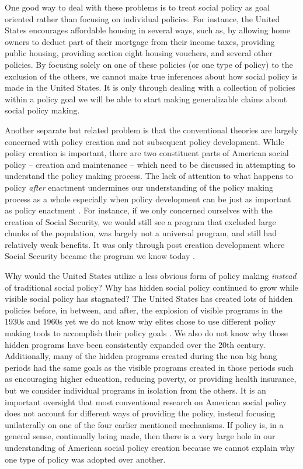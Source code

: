 \documentclass[12pt]{article}
\begin{document}
One good way to deal with these problems is to treat social policy as goal oriented rather than focusing on individual policies. For instance, the United States encourages affordable housing in several ways, such as, by allowing home owners to deduct part of their mortgage from their income taxes, providing public housing, providing section eight housing vouchers, and several other policies. By focusing solely on one of these policies (or one type of policy) to the exclusion of the others, we cannot make true inferences about how social policy is made in the United States. It is only through dealing with a collection of policies within a policy goal we will be able to start making generalizable claims about social policy making.

Another separate but related problem is that the conventional theories are largely concerned with policy creation and not subsequent policy development. While policy creation is important, there are two constituent parts of American social policy -- creation and maintenance -- which need to be discussed in attempting to understand the policy making process. The lack of attention to what happens to policy \emph{after} enactment undermines our understanding of the policy making process as a whole especially when policy development can be just as important as policy enactment \citep{patashnik2008}. For instance, if we only concerned ourselves with the creation of Social Security, we would still see a program that excluded large chunks of the population, was largely not a universal program, and still had relatively weak benefits. It was only through post creation development where Social Security became the program we know today \citep{derthick1979}. 

Why would the United States utilize a less obvious form of policy making \emph{instead} of traditional social policy? Why has hidden social policy continued to grow while visible social policy has stagnated? The United States has created lots of hidden policies before, in between, and after, the explosion of visible programs in the 1930s and 1960s yet we do not know why elites chose to use different policy making tools to accomplish their policy goals \citep[Ch. 2]{howard2008}. We also do not know why those hidden programs have been consistently expanded over the 20th century. Additionally, many of the hidden programs created during the non big bang periods had the same goals as the visible programs created in those periods such as encouraging higher education, reducing poverty, or providing health insurance, but we consider individual programs in isolation from the others. It is an important oversight that most conventional research on American social policy does not account for different ways of providing the policy, instead focusing unilaterally on one of the four earlier mentioned mechanisms. If policy is, in a general sense, continually being made, then there is a very large hole in our understanding of American social policy creation because we cannot explain why one type of policy was adopted over another.
\end{document}
